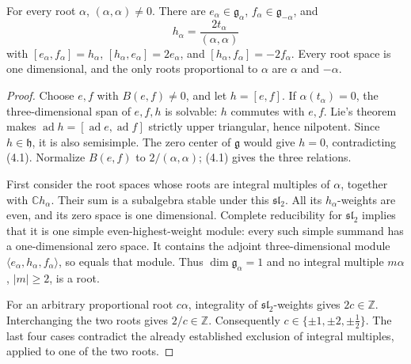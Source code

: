 \begin{theorem}\label{res:D03}
For every root \(\alpha\), \((\alpha,\alpha)\ne0\).
There are \(e_\alpha\in\mathfrak g_\alpha\),
\(f_\alpha\in\mathfrak g_{-\alpha}\), and
\[
 h_\alpha=\frac{2t_\alpha}{(\alpha,\alpha)}
\]
with \([e_\alpha,f_\alpha]=h_\alpha\),
\([h_\alpha,e_\alpha]=2e_\alpha\), and
\([h_\alpha,f_\alpha]=-2f_\alpha\).
Every root space is one dimensional, and the only roots proportional
to \(\alpha\) are \(\alpha\) and \(-\alpha\).
\end{theorem}
\begin{proof}
Choose \(e,f\) with \(B(e,f)\ne0\), and let \(h=[e,f]\).
If \(\alpha(t_\alpha)=0\), the three-dimensional span of \(e,f,h\)
is solvable: \(h\) commutes with \(e,f\). Lie's theorem makes
\(\operatorname{ad}h=[\operatorname{ad}e,\operatorname{ad}f]\)
strictly upper triangular, hence nilpotent. Since \(h\in\mathfrak h\),
it is also semisimple. The zero center of \(\mathfrak g\) would
give \(h=0\), contradicting (4.1). Normalize \(B(e,f)\) to
\(2/(\alpha,\alpha)\); (4.1) gives the three relations.

First consider the root spaces whose roots are integral multiples
of \(\alpha\), together with \(\mathbb C h_\alpha\).
Their sum is a subalgebra stable under this \(\mathfrak{sl}_2\).
All its \(h_\alpha\)-weights are even, and its zero space is
one dimensional. Complete reducibility for \(\mathfrak{sl}_2\)
implies that it is one simple even-highest-weight module: every
such simple summand has a one-dimensional zero space.
It contains the adjoint three-dimensional module
\(\langle e_\alpha,h_\alpha,f_\alpha\rangle\), so equals that module.
Thus \(\dim\mathfrak g_\alpha=1\) and no integral multiple
\(m\alpha\), \(|m|\ge2\), is a root.

For an arbitrary proportional root \(c\alpha\), integrality of
\(\mathfrak{sl}_2\)-weights gives \(2c\in\mathbb Z\).
Interchanging the two roots gives \(2/c\in\mathbb Z\).
Consequently \(c\in\{\pm1,\pm2,\pm\tfrac12\}\).
The last four cases contradict the already established exclusion
of integral multiples, applied to one of the two roots.
\end{proof}

